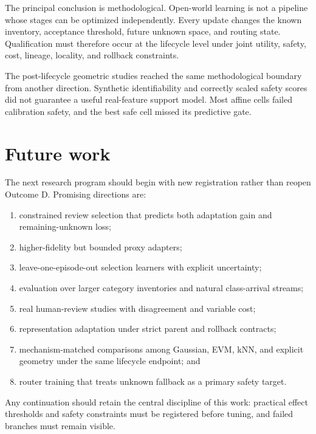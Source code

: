 \documentclass[12pt,oneside]{report}
\begin{document}
The principal conclusion is methodological. Open-world learning is not a
pipeline whose stages can be optimized independently. Every update changes the
known inventory, acceptance threshold, future unknown space, and routing
state. Qualification must therefore occur at the lifecycle level under joint
utility, safety, cost, lineage, locality, and rollback constraints.

The post-lifecycle geometric studies reached the same methodological boundary
from another direction. Synthetic identifiability and correctly scaled safety
scores did not guarantee a useful real-feature support model. Most affine cells
failed calibration safety, and the best safe cell missed its predictive gate.

\section{Future work}

The next research program should begin with new registration rather than reopen
Outcome D. Promising directions are:

\begin{enumerate}
\item constrained review selection that predicts both adaptation gain and
remaining-unknown loss;
\item higher-fidelity but bounded proxy adapters;
\item leave-one-episode-out selection learners with explicit uncertainty;
\item evaluation over larger category inventories and natural class-arrival
streams;
\item real human-review studies with disagreement and variable cost;
\item representation adaptation under strict parent and rollback contracts;
\item mechanism-matched comparisons among Gaussian, EVM, kNN, and explicit
geometry under the same lifecycle endpoint; and
\item router training that treats unknown fallback as a primary safety target.
\end{enumerate}

Any continuation should retain the central discipline of this work: practical
effect thresholds and safety constraints must be registered before tuning, and
failed branches must remain visible.
\end{document}
